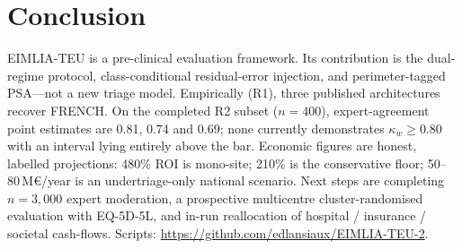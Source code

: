 \documentclass[conference]{IEEEtran}
\begin{document}
\section{Conclusion}
EIMLIA-TEU is a pre-clinical evaluation framework. Its contribution is the dual-regime protocol, class-conditional residual-error injection, and perimeter-tagged PSA---not a new triage model. Empirically (R1), three published architectures recover FRENCH. On the completed R2 subset ($n=400$), expert-agreement point estimates are 0.81, 0.74 and 0.69; none currently demonstrates $\kappa_w\geq0.80$ with an interval lying entirely above the bar. Economic figures are honest, labelled projections: 480\% ROI is mono-site; 210\% is the conservative floor; 50--80\,M€/year is an undertriage-only national scenario. Next steps are completing $n=3{,}000$ expert moderation, a prospective multicentre cluster-randomised evaluation with EQ-5D-5L, and in-run reallocation of hospital / insurance / societal cash-flows. Scripts: \url{https://github.com/edlansiaux/EIMLIA-TEU-2}.
\end{document}
